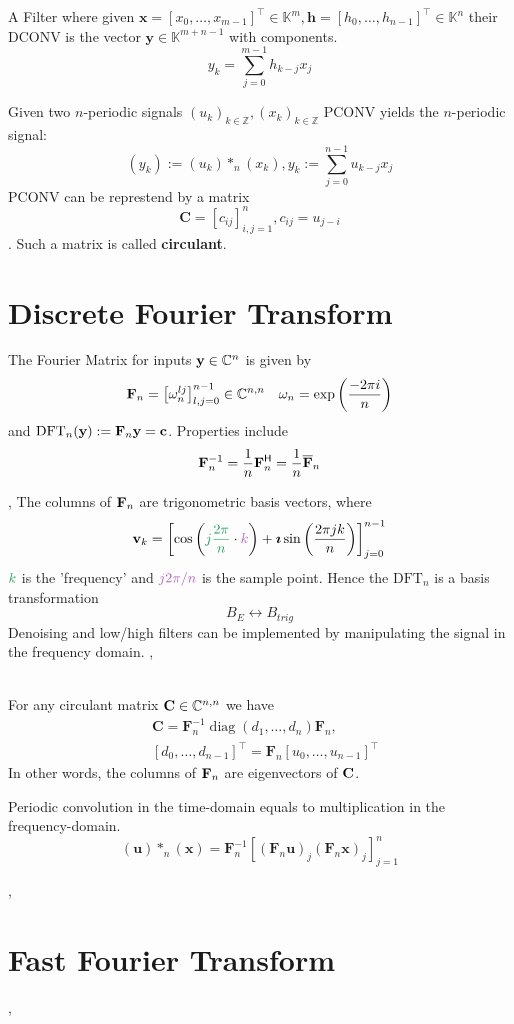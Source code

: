  A Filter where given $\mathbf{x}=\left[x_{0}, \ldots, x_{m-1}\right]^{\top} \in \mathbb{K}^{m}, \mathbf{h}=\left[h_{0}, \ldots, h_{n-1}\right]^{\top} \in \mathbb{K}^{n}$ their DCONV is the vector $\mathbf{y} \in \mathbb{K}^{m+n-1}$ with components.
$$y_{k}=\sum_{j=0}^{m-1} h_{k-j} x_{j}$$

 Given two $n$-periodic signals $\left(u_{k}\right)_{k \in \mathbb{Z}},\left(x_{k}\right)_{k \in \mathbb{Z}}$ PCONV yields the $n$-periodic signal:
$$\left(y_{k}\right):=\left(u_{k}\right) *_{n}\left(x_{k}\right), y_{k}:=\sum_{j=0}^{n-1} u_{k-j} x_{j}$$
PCONV can be represtend by a matrix $$\mathbf{C}=\left[c_{i j}\right]_{i, j=1}^{n}, c_{i j} = u_{j-i}$$. Such a matrix is called \textbf{circulant}.

\section{Discrete Fourier Transform}
The Fourier Matrix for inputs $\mathbf{y} \in \mathbb{C}^{n}$ is given by
$$ \mathbf{F}_n = \left[\omega_{n}^{l j}\right]_{l, j=0}^{n-1} \in \mathbb{C}^{n, n} \quad \omega_{n} = \exp\left(\frac{-2\pi i}{n}\right)$$
and $\mathrm{DFT}_{n}(\mathbf{y}):=\mathbf{F}_{n} \mathbf{y} = \mathbf{c}$. Properties include\\
$$\mathbf{F}_{n}^{-1}=\frac{1}{n} \mathbf{F}_{n}^{\mathsf{H}}=\frac{1}{n} \overline{\mathbf{F}}_{n}$$

\sep
{}
The columns of $\mathbf{F}_n$ are trigonometric basis vectors, where 
$$\vv_k = \left[\cos \left(\tcg{j\frac{2 \pi}{n}}\cdot \tcp{k}\right)+\boldsymbol{\imath} \sin \left(\frac{2 \pi j k}{n}\right)\right]_{j=0}^{n-1}$$
$\tcg{k}$ is the 'frequency' and $\tcp{j2\pi/n}$ is  the sample point.
Hence the $\mathrm{DFT}_{n}$ is a basis transformation $$B_E \leftrightarrow B_{trig}$$
Denoising and low/high filters can be implemented by manipulating the signal in the frequency domain.
\sep

 \\
For any circulant matrix $\mathbf{C} \in \mathbb{C}^{n,n}$ we have 
\begin{align*}
&\mathbf{C}=\mathbf{F}_{n}^{-1} \operatorname{diag}\left(d_{1}, \ldots, d_{n}\right) \mathbf{F}_{n}, \\ 
&\left[d_{0}, \ldots, d_{n-1}\right]^{\top}=\mathbf{F}_{n}\left[u_{0}, \ldots, u_{n-1}\right]^{\top}
\end{align*}
In other words, the columns of $\mathbf{F}_n$ are eigenvectors of $\mathbf{C}$.

Periodic convolution in the time-domain equals to multiplication in the frequency-domain.
$$
(\mathbf{u}) *_{n}(\mathbf{x})=\mathbf{F}_{n}^{-1}\left[\left(\mathbf{F}_{n} \mathbf{u}\right)_{j}\left(\mathbf{F}_{n} \mathbf{x}\right)_{j}\right]_{j=1}^{n}
$$

\sep
\Method[2D DFT]
\section{Fast Fourier Transform}

\sep
{}